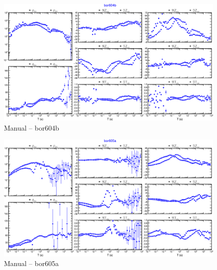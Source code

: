     \begin{figure}[H]
        \caption{Manual -- bor604b}
            \begin{center}
                \includegraphics[width=16cm]{texto/figura/sites/M-bor604b.png}
            \end{center}
    \end{figure}
    
    \begin{figure}[H]
        \caption{Manual -- bor605a}
            \begin{center}
                \includegraphics[width=16cm]{texto/figura/sites/M-bor605a.png}
            \end{center}
    \end{figure}
    
